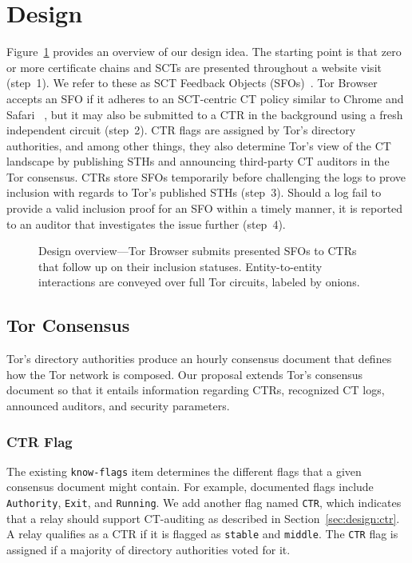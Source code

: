 \section{Design}
\label{sec:design}
Figure~\ref{fig:overview} provides an overview of our design idea.  The starting
point is that zero or more certificate chains and SCTs are presented
throughout a website visit (step~1).  We refer to these as SCT Feedback Objects
(SFOs)~\cite{nordberg}.  Tor Browser accepts an SFO if it adheres to an
SCT-centric CT policy similar to Chrome and Safari~%
\cite{chrome-policy,safari-policy}, but it may also be submitted to a CTR
in the background using a fresh independent circuit (step~2).  CTR flags are
assigned by Tor's directory authorities, and among other things, they also
determine Tor's view of the CT landscape by publishing STHs and announcing
third-party CT auditors in the Tor consensus.  CTRs store SFOs temporarily
before challenging the logs to prove inclusion with regards to Tor's published
STHs (step~3).  Should a log fail to provide a valid inclusion proof for an SFO
within a timely manner, it is reported to an auditor that investigates the issue
further (step~4).
\begin{figure}
	\centering
	
	\caption{%
		Design overview---Tor Browser submits presented SFOs to CTRs that follow
		up on their inclusion statuses.  Entity-to-entity interactions are
		conveyed over full Tor circuits, labeled by onions.
	}
	\label{fig:overview}
\end{figure}

\subsection{Tor Consensus}
Tor's directory authorities produce an hourly consensus document that defines
how the Tor network is composed.  Our proposal extends Tor's consensus document
so that it entails information regarding
	CTRs,
	recognized CT logs,
	announced auditors, and
	security parameters.

\subsubsection{CTR Flag}
The existing \texttt{know-flags} item determines the different flags that a
given consensus document might contain.  For example, documented flags include
\texttt{Authority}, \texttt{Exit}, and \texttt{Running}.  We add another flag
named \texttt{CTR}, which indicates that a relay should support CT-auditing as
described in Section~\ref{sec:design:ctr}.  A relay qualifies as a CTR if it is
flagged as \texttt{stable} and \texttt{middle}.  The \texttt{CTR} flag is
assigned if a majority of directory authorities voted for it.

